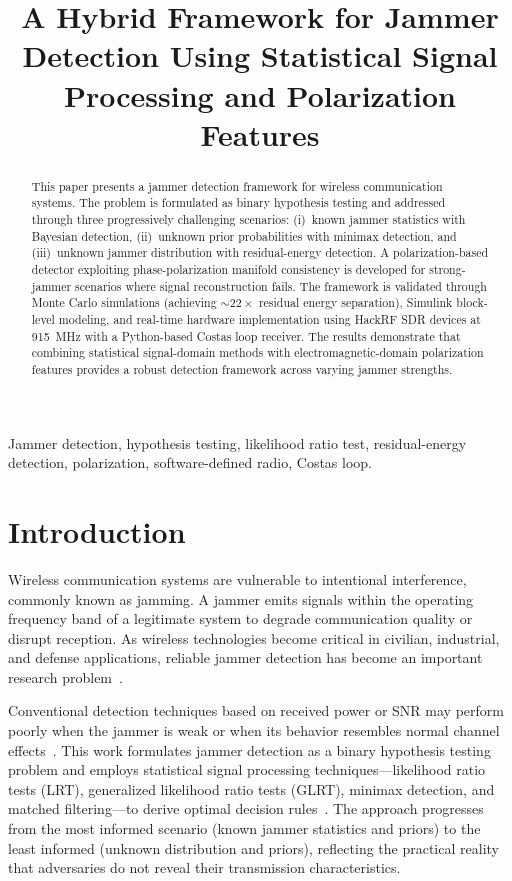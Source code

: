 \documentclass[conference]{IEEEtran}
\title{A Hybrid Framework for Jammer Detection Using Statistical Signal Processing and Polarization Features}
\author{\IEEEauthorblockN{Shreyash Puri}
\IEEEauthorblockA{Summer Research Fellow\\
Indian Institute of Technology Madras\\
July 2026}}
\begin{document}
\maketitle

\begin{abstract}
This paper presents a jammer detection framework for wireless communication systems. The problem is formulated as binary hypothesis testing and addressed through three progressively challenging scenarios: (i)~known jammer statistics with Bayesian detection, (ii)~unknown prior probabilities with minimax detection, and (iii)~unknown jammer distribution with residual-energy detection. A polarization-based detector exploiting phase-polarization manifold consistency is developed for strong-jammer scenarios where signal reconstruction fails. The framework is validated through Monte Carlo simulations (achieving ${\sim}22\times$ residual energy separation), Simulink block-level modeling, and real-time hardware implementation using HackRF SDR devices at 915~MHz with a Python-based Costas loop receiver. The results demonstrate that combining statistical signal-domain methods with electromagnetic-domain polarization features provides a robust detection framework across varying jammer strengths.
\end{abstract}

\begin{IEEEkeywords}
Jammer detection, hypothesis testing, likelihood ratio test, residual-energy detection, polarization, software-defined radio, Costas loop.
\end{IEEEkeywords}

\section{Introduction}

Wireless communication systems are vulnerable to intentional interference, commonly known as jamming. A jammer emits signals within the operating frequency band of a legitimate system to degrade communication quality or disrupt reception. As wireless technologies become critical in civilian, industrial, and defense applications, reliable jammer detection has become an important research problem~\cite{poisel2011,pirayesh2022}.

Conventional detection techniques based on received power or SNR may perform poorly when the jammer is weak or when its behavior resembles normal channel effects~\cite{xu2006}. This work formulates jammer detection as a binary hypothesis testing problem and employs statistical signal processing techniques---likelihood ratio tests (LRT), generalized likelihood ratio tests (GLRT), minimax detection, and matched filtering---to derive optimal decision rules~\cite{kay1998,poor1994}. The approach progresses from the most informed scenario (known jammer statistics and priors) to the least informed (unknown distribution and priors), reflecting the practical reality that adversaries do not reveal their transmission characteristics.
\end{document}
